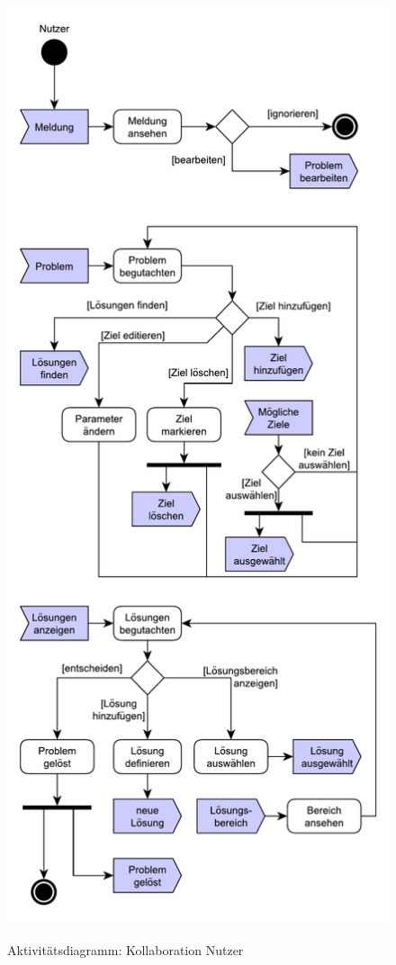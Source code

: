 \begin{figure}[htbp]
\centering
\includegraphics[scale=0.5]{Da_files/UML/Konzept/Aktivitaetsdiagramm-Nutzer.pdf}
\label{pic:Kollaboration-Nutzer}
\caption{Aktivitätsdiagramm: Kollaboration Nutzer}
\end{figure}

